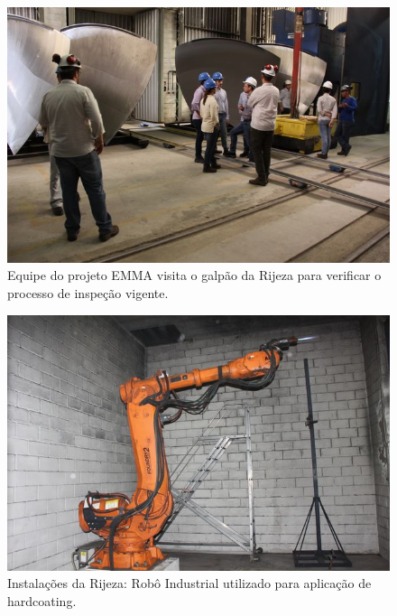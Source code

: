 \documentclass[a4paper,11pt,oneside,openany,brazilian,version=last,draft=false,]{main}
\begin{document}
\begin{twocolumn}
\begin{figure}[H]
\centering
\includegraphics[width=\columnwidth]{Fotos/img_4881.jpg}
\caption{Equipe do projeto EMMA visita o galpão da Rijeza para verificar o
processo de inspeção vigente.}
\label{fig:gull}
\end{figure}
\begin{figure}[H]
\centering
\includegraphics[width=\columnwidth]{Fotos/img_4858.jpg}
\caption{Instalações da Rijeza: Robô Industrial utilizado para aplicação de hardcoating.}
\end{figure}

% 


\end{twocolumn}
\end{document}

